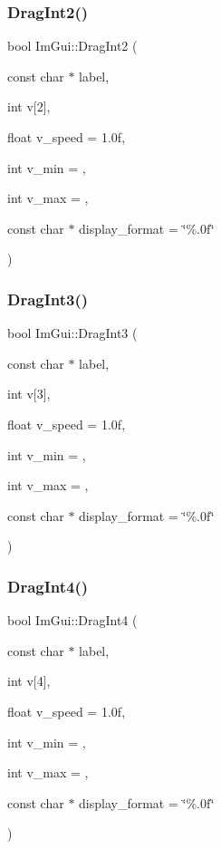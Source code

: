 \subsubsection{\texorpdfstring{Drag\+Int2()}{DragInt2()}}
{\footnotesize\ttfamily bool Im\+Gui\+::\+Drag\+Int2 (\begin{DoxyParamCaption}\item[{const char $\ast$}]{label,  }\item[{int}]{v\mbox{[}2\mbox{]},  }\item[{float}]{v\+\_\+speed = {\ttfamily 1.0f},  }\item[{int}]{v\+\_\+min = {},  }\item[{int}]{v\+\_\+max = {},  }\item[{const char $\ast$}]{display\+\_\+format = {\ttfamily \char`\"{}\%.0f\char`\"{}} }\end{DoxyParamCaption})}

\mbox{\label{namespace_im_gui_ab0b40f3d0631113d54fa8e0c90ed4f77}} 
\subsubsection{\texorpdfstring{Drag\+Int3()}{DragInt3()}}
{\footnotesize\ttfamily bool Im\+Gui\+::\+Drag\+Int3 (\begin{DoxyParamCaption}\item[{const char $\ast$}]{label,  }\item[{int}]{v\mbox{[}3\mbox{]},  }\item[{float}]{v\+\_\+speed = {\ttfamily 1.0f},  }\item[{int}]{v\+\_\+min = {},  }\item[{int}]{v\+\_\+max = {},  }\item[{const char $\ast$}]{display\+\_\+format = {\ttfamily \char`\"{}\%.0f\char`\"{}} }\end{DoxyParamCaption})}

\mbox{\label{namespace_im_gui_a65b6e42ba7a4aa73fd3e1dc74f93d180}} 
\subsubsection{\texorpdfstring{Drag\+Int4()}{DragInt4()}}
{\footnotesize\ttfamily bool Im\+Gui\+::\+Drag\+Int4 (\begin{DoxyParamCaption}\item[{const char $\ast$}]{label,  }\item[{int}]{v\mbox{[}4\mbox{]},  }\item[{float}]{v\+\_\+speed = {\ttfamily 1.0f},  }\item[{int}]{v\+\_\+min = {},  }\item[{int}]{v\+\_\+max = {},  }\item[{const char $\ast$}]{display\+\_\+format = {\ttfamily \char`\"{}\%.0f\char`\"{}} }\end{DoxyParamCaption})}

